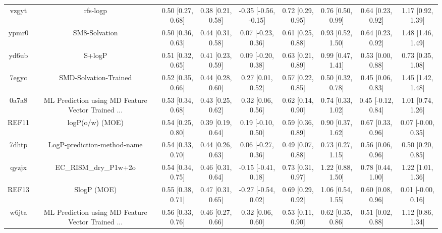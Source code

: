 \documentclass{article}
\begin{document}
\begin{center}
\begin{longtable}{|ccccccccc|}
 vzgyt &                                           rfs-logp &  0.50 [0.27, 0.68] &  0.38 [0.21, 0.58] &  -0.35 [-0.56, -0.15] &  0.72 [0.29, 0.95] &    0.76 [0.50, 0.99] &    0.64 [0.23, 0.92] &     1.17 [0.92, 1.39] \\
 ypmr0 &                                      SM8-Solvation &  0.50 [0.36, 0.63] &  0.44 [0.31, 0.58] &    0.07 [-0.23, 0.36] &  0.61 [0.25, 0.88] &    0.93 [0.52, 1.50] &    0.64 [0.23, 0.92] &     1.48 [1.46, 1.49] \\
 yd6ub &                                             S+logP &  0.51 [0.32, 0.65] &  0.41 [0.23, 0.59] &    0.09 [-0.20, 0.38] &  0.63 [0.21, 0.89] &    0.99 [0.47, 1.41] &    0.53 [0.00, 0.88] &     0.73 [0.35, 1.08] \\
 7egyc &                              SMD-Solvation-Trained &  0.52 [0.35, 0.66] &  0.44 [0.28, 0.60] &     0.27 [0.01, 0.52] &  0.57 [0.22, 0.85] &    0.50 [0.32, 0.78] &    0.45 [0.06, 0.83] &     1.45 [1.42, 1.48] \\
 0a7a8 &  ML Prediction using MD Feature Vector Trained ... &  0.53 [0.34, 0.68] &  0.43 [0.25, 0.62] &     0.32 [0.06, 0.56] &  0.62 [0.14, 0.90] &    0.74 [0.33, 1.02] &   0.45 [-0.12, 0.84] &     1.01 [0.74, 1.26] \\
 REF11 &                                    logP(o/w) (MOE) &  0.54 [0.25, 0.80] &  0.39 [0.19, 0.64] &    0.19 [-0.10, 0.50] &  0.59 [0.36, 0.89] &    0.90 [0.37, 1.62] &    0.67 [0.33, 0.96] &    0.07 [-0.00, 0.35] \\
 7dhtp &                        LogP-prediction-method-name &  0.54 [0.33, 0.70] &  0.44 [0.26, 0.63] &    0.06 [-0.27, 0.36] &  0.49 [0.07, 0.88] &    0.73 [0.27, 1.15] &    0.56 [0.06, 0.96] &     0.50 [0.20, 0.85] \\
 qyzjx &                              EC\_RISM\_dry\_P1w+2o &  0.54 [0.34, 0.75] &  0.46 [0.31, 0.64] &   -0.15 [-0.41, 0.18] &  0.73 [0.31, 0.97] &    1.22 [0.88, 1.50] &    0.78 [0.44, 1.00] &     1.22 [1.01, 1.36] \\
 REF13 &                                        SlogP (MOE) &  0.55 [0.38, 0.71] &  0.47 [0.31, 0.65] &   -0.27 [-0.54, 0.02] &  0.69 [0.29, 0.92] &    1.06 [0.54, 1.55] &    0.60 [0.08, 0.96] &    0.01 [-0.00, 0.16] \\
 w6jta &  ML Prediction using MD Feature Vector Trained ... &  0.56 [0.33, 0.76] &  0.46 [0.27, 0.66] &     0.32 [0.06, 0.60] &  0.53 [0.11, 0.90] &    0.62 [0.35, 0.86] &    0.51 [0.02, 0.88] &     1.12 [0.86, 1.34] \\

\end{longtable}
\end{center}
\end{document}
